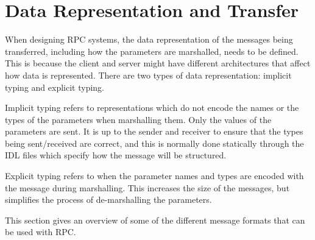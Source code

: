 \section{Data Representation and Transfer} %
\label{sec:data_representation_and_transfer}

When designing RPC systems, the data representation of the messages being transferred, including how the parameters are marshalled, needs to be defined. This is because the client and server might have different architectures that affect how data is represented. There are two types of data representation: implicit typing and explicit typing.

Implicit typing refers to representations which do not encode the names or the types of the parameters when marshalling them. Only the values of the parameters are sent. It is up to the sender and receiver to ensure that the types being sent/received are correct, and this is normally done statically through the IDL files which specify how the message will be structured. 

Explicit typing refers to when the parameter names and types are encoded with the message during marshalling. This increases the size of the messages, but simplifies the process of de-marshalling the parameters.

This section gives an overview of some of the different message formats that can be used with RPC.


